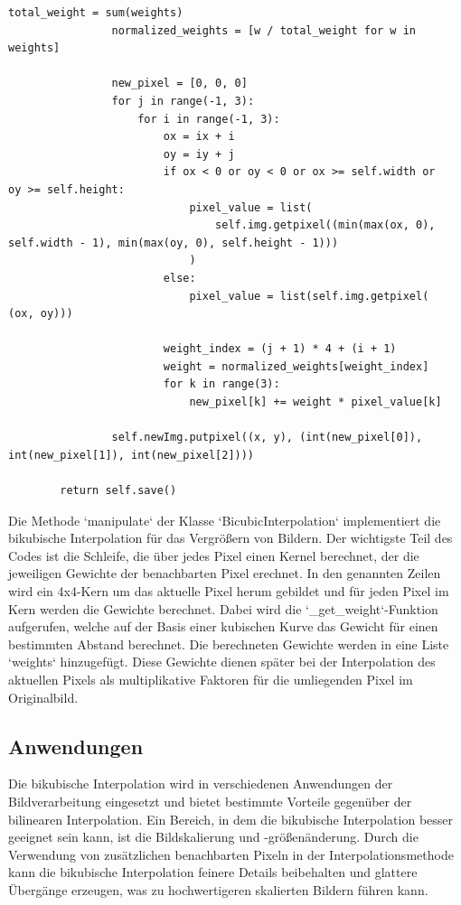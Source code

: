 \begin{lstlisting}[caption={Python-Klasse zur Bikubischen interpolation \url{https://github.com/studienarbeit-cnn-dhbwka-2022/Code/blob/main/backend/skalierungsmethoden/bicubic_interpolation.py}.}]
                total_weight = sum(weights)
                normalized_weights = [w / total_weight for w in weights]

                new_pixel = [0, 0, 0]
                for j in range(-1, 3):
                    for i in range(-1, 3):
                        ox = ix + i
                        oy = iy + j
                        if ox < 0 or oy < 0 or ox >= self.width or
oy >= self.height:
                            pixel_value = list(
                                self.img.getpixel((min(max(ox, 0),
self.width - 1), min(max(oy, 0), self.height - 1)))
                            )
                        else:
                            pixel_value = list(self.img.getpixel(
(ox, oy)))

                        weight_index = (j + 1) * 4 + (i + 1)
                        weight = normalized_weights[weight_index]
                        for k in range(3):
                            new_pixel[k] += weight * pixel_value[k]

                self.newImg.putpixel((x, y), (int(new_pixel[0]),
int(new_pixel[1]), int(new_pixel[2])))

        return self.save()
    \end{lstlisting}
    
    Die Methode `manipulate` der Klasse `BicubicInterpolation` implementiert die bikubische Interpolation für das Vergrößern von Bildern.
    Der wichtigste Teil des Codes ist die Schleife, die über jedes Pixel einen Kernel berechnet, der die jeweiligen Gewichte der benachbarten Pixel erechnet.
    In den genannten Zeilen wird ein 4x4-Kern um das aktuelle Pixel herum gebildet und für jeden Pixel im Kern werden die Gewichte berechnet.
    Dabei wird die `\_get\_weight`-Funktion aufgerufen, welche auf der Basis einer kubischen Kurve das Gewicht für einen bestimmten Abstand berechnet.
    Die berechneten Gewichte werden in eine Liste `weights` hinzugefügt.
    Diese Gewichte dienen später bei der Interpolation des aktuellen Pixels als multiplikative Faktoren für die umliegenden Pixel im Originalbild.
    
    \subsection{Anwendungen}

Die bikubische Interpolation wird in verschiedenen Anwendungen der Bildverarbeitung eingesetzt und bietet bestimmte Vorteile gegenüber der bilinearen Interpolation.
Ein Bereich, in dem die bikubische Interpolation besser geeignet sein kann, ist die Bildskalierung und -größenänderung.
Durch die Verwendung von zusätzlichen benachbarten Pixeln in der Interpolationsmethode kann die bikubische Interpolation feinere Details beibehalten und glattere Übergänge erzeugen, was zu hochwertigeren skalierten Bildern führen kann.

